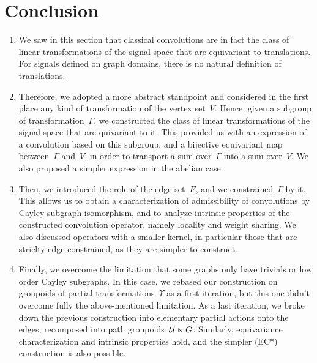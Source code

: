 \section{Conclusion}

\begin{enumerate}
\item We saw in this section that classical convolutions are in fact the class of linear transformations of the signal space that are equivariant to translations. For signals defined on graph domains, there is no natural definition of translations.
\item Therefore, we adopted a more abstract standpoint and considered in the first place any kind of transformation of the vertex set~$V$. Hence, given a subgroup of transformation~$\Gamma$, we constructed the class of linear transformations of the signal space that are quivariant to it. This provided us with an expression of a convolution based on this subgroup, and a bijective equivariant map between~$\Gamma$ and~$V$, in order to transport a sum over~$\Gamma$ into a sum over~$V$. We also proposed a simpler expression in the abelian case.
\item Then, we introduced the role of the edge set~$E$, and we constrained~$\Gamma$ by it. This allows us to obtain a characterization of admissibility of convolutions by Cayley subgraph isomorphism, and to analyze intrinsic properties of the constructed convolution operator, namely locality and weight sharing. We also discussed operators with a smaller kernel, in particular those that are striclty edge-constrained, as they are simpler to construct.
\item Finally, we overcome the limitation that some graphs only have trivials or low order Cayley subgraphs. In this case, we rebased our construction on groupoids of partial transformations~$\Upsilon$ as a first iteration, but this one didn't overcome fully the above-mentioned limitation. As a last iteration, we broke down the previous construction into elementary partial actions onto the edges, recomposed into path groupoids~$\mathcal{U} \ltimes G$. Similarly, equivariance characterization and intrinsic properties hold, and the simpler (EC*) construction is also possible.
\end{enumerate}

